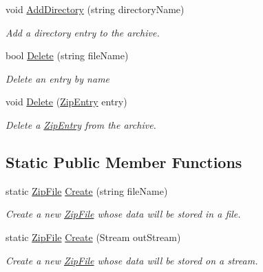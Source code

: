 \begin{DoxyCompactItemize}
void \hyperlink{class_i_c_sharp_code_1_1_sharp_zip_lib_1_1_zip_1_1_zip_file_afa97d541dc27bcc03953c4d0a07d6b06}{Add\+Directory} (string directory\+Name)
\begin{DoxyCompactList}\small\item\em Add a directory entry to the archive. \end{DoxyCompactList}\item 
bool \hyperlink{class_i_c_sharp_code_1_1_sharp_zip_lib_1_1_zip_1_1_zip_file_a590572f5655ec1d33908de6e12488aea}{Delete} (string file\+Name)
\begin{DoxyCompactList}\small\item\em Delete an entry by name \end{DoxyCompactList}\item 
void \hyperlink{class_i_c_sharp_code_1_1_sharp_zip_lib_1_1_zip_1_1_zip_file_af471c6bdea11a15e0cde3f4075ec6603}{Delete} (\hyperlink{class_i_c_sharp_code_1_1_sharp_zip_lib_1_1_zip_1_1_zip_entry}{Zip\+Entry} entry)
\begin{DoxyCompactList}\small\item\em Delete a \hyperlink{class_i_c_sharp_code_1_1_sharp_zip_lib_1_1_zip_1_1_zip_entry}{Zip\+Entry} from the archive. \end{DoxyCompactList}\end{DoxyCompactItemize}
\subsection*{Static Public Member Functions}
\begin{DoxyCompactItemize}
\item 
static \hyperlink{class_i_c_sharp_code_1_1_sharp_zip_lib_1_1_zip_1_1_zip_file}{Zip\+File} \hyperlink{class_i_c_sharp_code_1_1_sharp_zip_lib_1_1_zip_1_1_zip_file_af32411ce024f000e0590d8d7e9e392de}{Create} (string file\+Name)
\begin{DoxyCompactList}\small\item\em Create a new \hyperlink{class_i_c_sharp_code_1_1_sharp_zip_lib_1_1_zip_1_1_zip_file}{Zip\+File} whose data will be stored in a file. \end{DoxyCompactList}\item 
static \hyperlink{class_i_c_sharp_code_1_1_sharp_zip_lib_1_1_zip_1_1_zip_file}{Zip\+File} \hyperlink{class_i_c_sharp_code_1_1_sharp_zip_lib_1_1_zip_1_1_zip_file_a80e98c2c63579ebf1ccd5f4f931e8a97}{Create} (Stream out\+Stream)
\begin{DoxyCompactList}\small\item\em Create a new \hyperlink{class_i_c_sharp_code_1_1_sharp_zip_lib_1_1_zip_1_1_zip_file}{Zip\+File} whose data will be stored on a stream. \end{DoxyCompactList}\end{DoxyCompactItemize}
